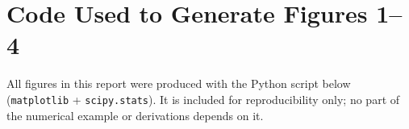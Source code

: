 \documentclass[a4paper,11pt]{article}
\begin{document}



\appendix
\section{Code Used to Generate Figures 1--4}
\label{app:code}
All figures in this report were produced with the Python script below (\texttt{matplotlib} + \texttt{scipy.stats}). It is included for reproducibility only; no part of the numerical example or derivations depends on it.

\end{document}
